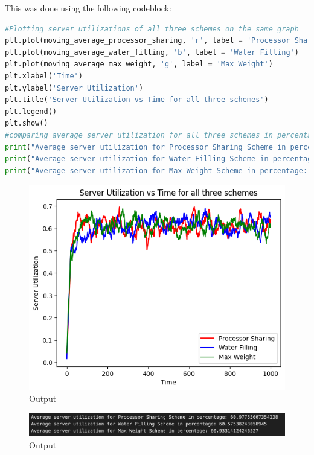 \documentclass[11pt, a4paper]{article}
\begin{document}
This was done using the following codeblock:
\begin{lstlisting}[language=Python]
#Plotting server utilizations of all three schemes on the same graph
plt.plot(moving_average_processor_sharing, 'r', label = 'Processor Sharing')
plt.plot(moving_average_water_filling, 'b', label = 'Water Filling')
plt.plot(moving_average_max_weight, 'g', label = 'Max Weight')
plt.xlabel('Time')
plt.ylabel('Server Utilization')
plt.title('Server Utilization vs Time for all three schemes')
plt.legend()
plt.show()
#comparing average server utilization for all three schemes in percentage
print("Average server utilization for Processor Sharing Scheme in percentage:", np.mean(server_utilization_processor_sharing)*100)
print("Average server utilization for Water Filling Scheme in percentage:", np.mean(server_utilization_water_filling)*100)
print("Average server utilization for Max Weight Scheme in percentage:", np.mean(server_utilization_max_weight)*100)

\end{lstlisting}


\begin{figure}[H]
     \centering
     \includegraphics[scale=0.5]{fig_8.png}
     \caption{Output}
\end{figure}
\begin{figure}[H]
     \centering
     \includegraphics[scale=0.2]{fig_10.png}
     \caption{Output}
\end{figure}
\end{document}
